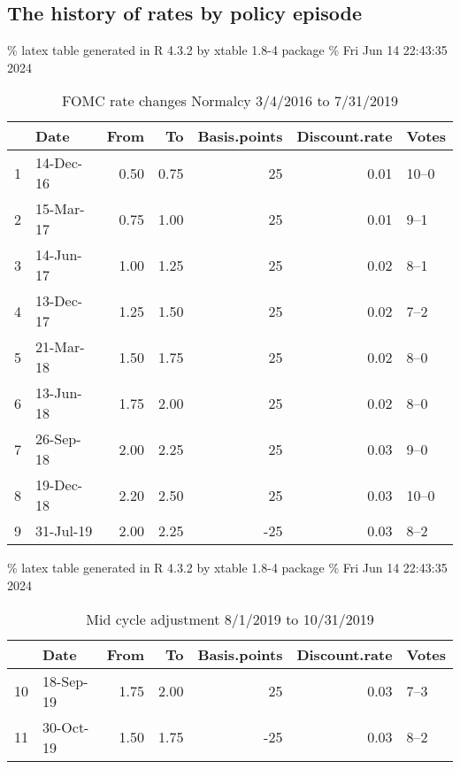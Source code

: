 \documentclass[
]{article}
\begin{document}
\hypertarget{the-history-of-rates-by-policy-episode}{%
\subsection{The history of rates by policy episode}\label{the-history-of-rates-by-policy-episode}}

\% latex table generated in R 4.3.2 by xtable 1.8-4 package
\% Fri Jun 14 22:43:35 2024

\begin{table}[ht]
\centering
\begin{tabular}{rlrrrrl}
  \hline
 & Date & From & To & Basis.points & Discount.rate & Votes \\ 
  \hline
1 & 14-Dec-16 & 0.50 & 0.75 &  25 & 0.01 & 10–0 \\ 
  2 & 15-Mar-17 & 0.75 & 1.00 &  25 & 0.01 & 9–1 \\ 
  3 & 14-Jun-17 & 1.00 & 1.25 &  25 & 0.02 & 8–1 \\ 
  4 & 13-Dec-17 & 1.25 & 1.50 &  25 & 0.02 & 7–2 \\ 
  5 & 21-Mar-18 & 1.50 & 1.75 &  25 & 0.02 & 8–0 \\ 
  6 & 13-Jun-18 & 1.75 & 2.00 &  25 & 0.02 & 8–0 \\ 
  7 & 26-Sep-18 & 2.00 & 2.25 &  25 & 0.03 & 9–0 \\ 
  8 & 19-Dec-18 & 2.20 & 2.50 &  25 & 0.03 & 10–0 \\ 
  9 & 31-Jul-19 & 2.00 & 2.25 & -25 & 0.03 & 8–2 \\ 
   \hline
\end{tabular}
\caption{FOMC rate changes Normalcy 3/4/2016 to 7/31/2019} 
\label{tab:fomcnorm}
\end{table}

\% latex table generated in R 4.3.2 by xtable 1.8-4 package
\% Fri Jun 14 22:43:35 2024

\begin{table}[ht]
\centering
\begin{tabular}{rlrrrrl}
  \hline
 & Date & From & To & Basis.points & Discount.rate & Votes \\ 
  \hline
10 & 18-Sep-19 & 1.75 & 2.00 &  25 & 0.03 & 7–3 \\ 
  11 & 30-Oct-19 & 1.50 & 1.75 & -25 & 0.03 & 8–2 \\ 
   \hline
\end{tabular}
\caption{Mid cycle adjustment 8/1/2019 to 10/31/2019} 
\label{tab:fomcadjust}
\end{table}
\end{document}
